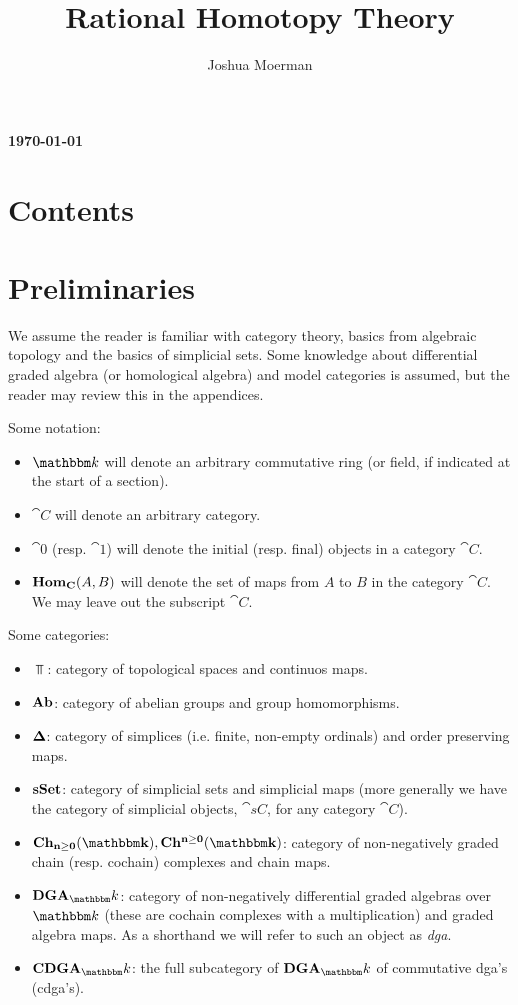 \documentclass[a4paper, 12pt]{amsart}
\title{Rational Homotopy Theory}
\author{Joshua Moerman}
\begin{document}
\maketitle
{\bf \today}

\section*{Contents}
\tableofcontents

\section*{Preliminaries}
We assume the reader is familiar with category theory, basics from algebraic topology and the basics of simplicial sets. Some knowledge about differential graded algebra (or homological algebra) and model categories is assumed, but the reader may review this in the appendices.

Some notation:
\begin{itemize}
	\item $\k$ will denote an arbitrary commutative ring (or field, if indicated at the start of a section).
	\item $\cat{C}$ will denote an arbitrary category.
	\item $\cat{0}$ (resp. $\cat{1}$) will denote the initial (resp. final) objects in a category $\cat{C}$.
	\item $\mathbf{Hom}_{\mathbf{C}}(A, B)$ will denote the set of maps from $A$ to $B$ in the category $\cat{C}$. We may leave out the subscript $\cat{C}$.
\end{itemize}

Some categories:
\begin{itemize}
	\item $\Top$: category of topological spaces and continuos maps.
	\item $\mathbf{Ab}$: category of abelian groups and group homomorphisms.
	\item $\boldsymbol{\Delta}$: category of simplices (i.e. finite, non-empty ordinals) and order preserving maps.
	\item $\mathbf{s{\mathbf{Set}}}$: category of simplicial sets and simplicial maps (more generally we have the category of simplicial objects, $\cat{sC}$, for any category $\cat{C}$).
	\item $\Ch{\k}, \CoCh{\k}$: category of non-negatively graded chain (resp. cochain) complexes and chain maps.
	\item $\DGA_\k$: category of non-negatively differential graded algebras over $\k$ (these are cochain complexes with a multiplication) and graded algebra  maps. As a shorthand we will refer to such an object as \emph{dga}.
	\item $\CDGA_\k$: the full subcategory of $\DGA_\k$ of commutative dga's (cdga's).
\end{itemize}
\end{document}
